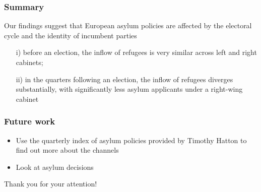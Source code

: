 \documentclass[compress, xcolor = {table,xcdraw}]{beamer}
\begin{document}
\begin{frame}
\frametitle{Summary}
Our findings suggest that European asylum policies are affected by the electoral cycle and the identity of incumbent parties
\begin{itemize}
	\item[i)]before an election, the inflow of refugees is very similar across left and right cabinets;
	\item[ii)]in the quarters following an election, the inflow of refugees diverges substantially, with significantly less asylum applicants under a right-wing cabinet
\end{itemize}
\end{frame}


\begin{frame}
\frametitle{Future work}
\begin{itemize}

	\item Use the quarterly index of asylum policies provided by Timothy Hatton to find out more about the channels
	\item Look at asylum decisions
\end{itemize}
\end{frame}

\begin{frame}
\centering
\Large
Thank you for your attention!
\end{frame}
\end{document}

